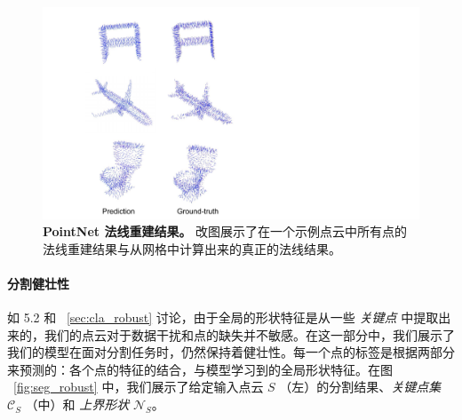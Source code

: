 \begin{figure}[t!]
\centering
\includegraphics[width=0.9\linewidth]{fig/normal_recon2.pdf}
\caption{\textbf{PointNet 法线重建结果。} 改图展示了在一个示例点云中所有点的法线重建结果与从网格中计算出来的真正的法线结果。}
\label{fig:normal_recon}
\end{figure}


\paragraph{分割健壮性} 如 5.2 和 ~\ref{sec:cla_robust} 讨论，由于全局的形状特征是从一些 \textit{关键点} 中提取出来的，我们的点云对于数据干扰和点的缺失并不敏感。在这一部分中，我们展示了我们的模型在面对分割任务时，仍然保持着健壮性。每一个点的标签是根据两部分来预测的：各个点的特征的结合，与模型学习到的全局形状特征。在图 ~\ref{fig:seg_robust} 中，我们展示了给定输入点云 $S$ （左）的分割结果、\textit{关键点集} $\mathcal{C}_S$ （中）和 \textit{上界形状} $\mathcal{N}_S$。



